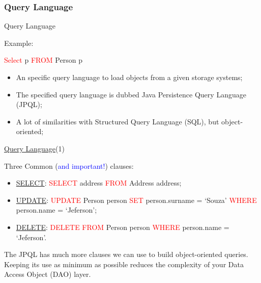 \documentclass[xcolor=x11names,compress]{beamer}
\renewcommand{\(}{\begin{columns}}
\renewcommand{\)}{\end{columns}}
\newcommand{\<}[1]{\begin{column}{#1}}
\renewcommand{\>}{\end{column}}
\begin{document}
\subsubsection{Query Language}
\begin{frame}{Query Language}

Example:
\begin{center}
\begin{framed}
\textcolor{red}{Select} p \textcolor{red}{FROM} Person p
\end{framed}
\end{center}
\begin{itemize}
\itemsep 12pt
\justifying

\item An specific query language to load objects from a given storage systems;

\item The specified query language is dubbed Java Persistence Query Language (JPQL);

\item A lot of similarities with Structured Query Language (SQL), but object-oriented;

\end{itemize}

\end{frame}


\begin{frame}{\underline{Query Language}(1)}

\justifying

Three Common (\textcolor{blue}{and important!}) clauses:
\\[.5mm]
\begin{itemize}
\itemsep 12pt

\item \underline{SELECT}: \textcolor{red}{SELECT} address \textcolor{red}{FROM} Address address;

\item \underline{UPDATE}: \textcolor{red}{UPDATE} Person person \textcolor{red}{SET} person.surname = `Souza' \textcolor{red}{WHERE} person.name = `Jeferson';

\item \underline{DELETE}:  \textcolor{red}{DELETE} \textcolor{red}{FROM} Person person \textcolor{red}{WHERE} person.name = `Jeferson'.

\end{itemize}
\vspace*{1mm}
The JPQL has much more clauses we can use to build object-oriented queries. Keeping its use as minimum as possible reduces the complexity of your Data Access Object (DAO) layer.

\end{frame}
\end{document}
